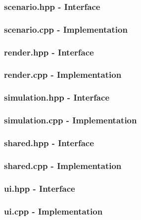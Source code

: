 {\subsubsection{scenario.hpp - Interface}
\texttt{} 
\pagebreak
\subsubsection{scenario.cpp - Implementation}
\texttt{} 
\subsubsection{render.hpp - Interface}
\texttt{} 
\pagebreak
\subsubsection{render.cpp - Implementation}
\texttt{} 
\pagebreak
\subsubsection{simulation.hpp - Interface}
\texttt{} 
\pagebreak
\subsubsection{simulation.cpp - Implementation}
\texttt{} 
\pagebreak
\subsubsection{shared.hpp - Interface}
\texttt{} 
\pagebreak
\subsubsection{shared.cpp - Implementation}
\texttt{} 
\pagebreak
\subsubsection{ui.hpp - Interface}
\texttt{} 
\pagebreak
\subsubsection{ui.cpp - Implementation}
\texttt{} 
\begin{figure}

\end{figure}}
